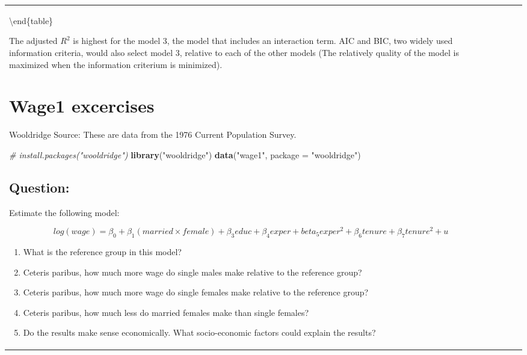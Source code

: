 \documentclass[12pt,]{article}
\newenvironment{Shaded}{\begin{snugshade}}{\end{snugshade}}
\newcommand{\CommentTok}[1]{\textcolor[rgb]{0.56,0.35,0.01}{\textit{#1}}}
\newcommand{\DataTypeTok}[1]{\textcolor[rgb]{0.13,0.29,0.53}{#1}}
\newcommand{\KeywordTok}[1]{\textcolor[rgb]{0.13,0.29,0.53}{\textbf{#1}}}
\newcommand{\NormalTok}[1]{#1}
\newcommand{\StringTok}[1]{\textcolor[rgb]{0.31,0.60,0.02}{#1}}
\providecommand{\tightlist}{%
  \setlength{\itemsep}{0pt}\setlength{\parskip}{0pt}}
\begin{document}
\providecommand{\huxb}[2][0,0,0]{\arrayrulecolor[RGB]{#1}\global\arrayrulewidth=#2pt}
    \providecommand{\huxvb}[2][0,0,0]{\color[RGB]{#1}\vrule width #2pt}
    \providecommand{\huxtpad}[1]{\rule{0pt}{\baselineskip+#1}}
    \providecommand{\huxbpad}[1]{\rule[-#1]{0pt}{#1}}
  \begin{tabularx}{0.5\textwidth}{p{} p{} p{} p{}}

\textbackslash{}end\{table\}

The adjusted \(R^2\) is highest for the model 3, the model that includes
an interaction term. AIC and BIC, two widely used information criteria,
would also select model 3, relative to each of the other models (The
relatively quality of the model is maximized when the information
criterium is minimized).

\hypertarget{wage1-excercises}{%
\section{Wage1 excercises}\label{wage1-excercises}}

Wooldridge Source: These are data from the 1976 Current Population
Survey.

\begin{Shaded}
\begin{Highlighting}[]
\CommentTok{# install.packages("wooldridge")}
\KeywordTok{library}\NormalTok{(}\StringTok{"wooldridge"}\NormalTok{) }
\KeywordTok{data}\NormalTok{(}\StringTok{"wage1"}\NormalTok{, }\DataTypeTok{package =} \StringTok{"wooldridge"}\NormalTok{)}
\end{Highlighting}
\end{Shaded}

\hypertarget{question-14}{%
\subsection{Question:}\label{question-14}}

Estimate the following model:

\begin{equation}
log(wage) = \beta_0 +  \beta_1 (married \times female) +  \beta_3 educ + \beta_4 exper + beta_5 exper^2 + \beta_6 tenure + \beta_7 tenure^2 + u 
\end{equation}

\begin{enumerate}
\def\labelenumi{\arabic{enumi}.}
\tightlist
\item
  What is the reference group in this model?
\item
  Ceteris paribus, how much more wage do single males make relative to
  the reference group?
\item
  Ceteris paribus, how much more wage do single females make relative to
  the reference group?
\item
  Ceteris paribus, how much less do married females make than single
  females?
\item
  Do the results make sense economically. What socio-economic factors
  could explain the results?
\end{enumerate}


\end{tabularx}
\end{document}
